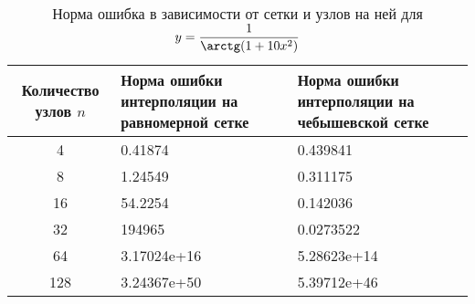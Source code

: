 \documentclass{article}
\begin{document}
    \begin{table}[H]
        \centering
        \caption{Норма ошибка в зависимости от сетки и узлов на ней для $y = \dfrac{1}{\arctg (1+10x^2)}$}
        \begin{tabular}{|c|p{5cm}|p{5cm}|}
            \hline
            Количество узлов $n$ & Норма ошибки интерполяции
            на равномерной сетке & Норма ошибки интерполяции
            на чебышевской сетке \\
            \hline 
            4 & 0.41874 &  0.439841 \\ \hline
            8 &  1.24549 & 0.311175\\ \hline
            16 &54.2254 & 0.142036\\ \hline
            32 & 194965 & 0.0273522\\ \hline
            64 &3.17024e+16 &  5.28623e+14\\ \hline
            128 &  3.24367e+50&  5.39712e+46\\ \hline
        \end{tabular}
    \end{table}
\end{document}
